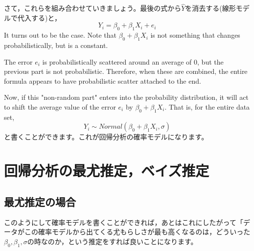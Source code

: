 \documentclass{ltjsarticle}
\begin{document}
さて，これらを組み合わせていきましょう。最後の式から$\hat{Y}$を消去する(線形モデルで代入する)と，
\[ Y_i =  \beta_0 + \beta_1 X_i+ e_i \]
It turns out to be the case. Note that $ \beta_0 + \beta_1 X_i$ is not something that changes probabilistically, but is a constant.

The error $e_i$ is probabilistically scattered around an average of 0, but the previous part is not probabilistic. Therefore, when these are combined, the entire formula appears to have probabilistic scatter attached to the end.


Now, if this "non-random part" enters into the probability distribution, it will act to shift the average value of the error $e_i$ by $\beta_0 + \beta_1 X_i$. That is, for the entire data set,
\[ Y_i \sim Normal(\beta_0 + \beta_1 X_i , \sigma) \]
と書くことができます。これが回帰分析の確率モデルになります。

\section{回帰分析の最尤推定，ベイズ推定}
\subsection{最尤推定の場合}
このようにして確率モデルを書くことができれば，あとはこれにしたがって「データがこの確率モデルから出てくる尤もらしさが最も高くなるのは，どういった$\beta_0, \beta_1, \sigma$の時なのか，という推定をすれば良いことになります。
\end{document}
